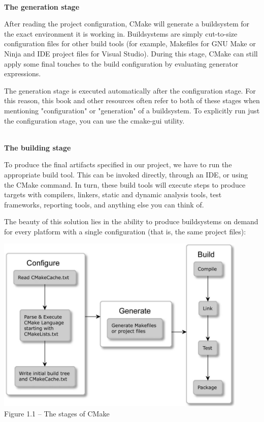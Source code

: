 \hspace*{\fill} \\ %
\noindent
\textbf{The generation stage}

After reading the project configuration, CMake will generate a buildsystem for the exact environment it is working in. Buildsystems are simply cut-to-size configuration files for other build tools (for example, Makefiles for GNU Make or Ninja and IDE project files for Visual Studio). During this stage, CMake can still apply some final touches to the build configuration by evaluating generator expressions.

\begin{tcolorbox}[colback=blue!5!white,colframe=blue!75!black,title=Note]
The generation stage is executed automatically after the configuration stage. For this reason, this book and other resources often refer to both of these stages when mentioning "configuration" or "generation" of a buildsystem. To explicitly run just the configuration stage, you can use the cmake-gui utility.
\end{tcolorbox}

\hspace*{\fill} \\ %
\noindent
\textbf{The building stage}

To produce the final artifacts specified in our project, we have to run the appropriate build tool. This can be invoked directly, through an IDE, or using the CMake command. In turn, these build tools will execute steps to produce targets with compilers, linkers, static and dynamic analysis tools, test frameworks, reporting tools, and anything else you can think of.

The beauty of this solution lies in the ability to produce buildsystems on demand for every platform with a single configuration (that is, the same project files):

\begin{center}
\includegraphics[width=0.9\textwidth]{content/1/chapter1/images/1.jpg}\\
Figure 1.1 – The stages of CMake
\end{center}

